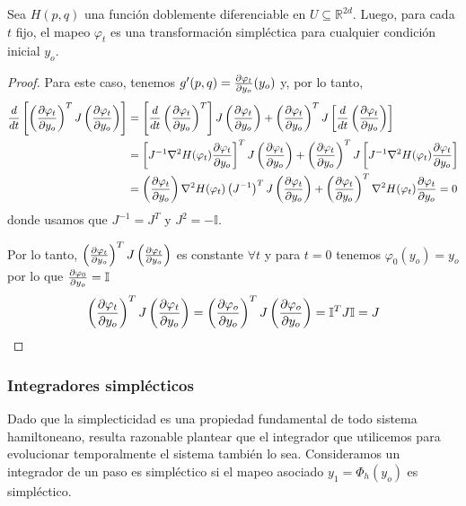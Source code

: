 \begin{theorem}{\label{teo:preservacion_evol}}
  Sea $H(p,q)$ una función doblemente diferenciable en $U\subseteq\mathbb{R}^{2d}$. Luego, para cada $t$ fijo, el mapeo $\varphi_t$ es una transformación simpléctica
  para cualquier condición inicial $y_o$.
\end{theorem}
\begin{proof}
 Para este caso, tenemos $g'(p,q) = \frac{\partial\varphi_t}{\partial y_o}(y_o)$ y, por lo tanto,
 \begin{align*}
  \frac{d}{dt}\left[ \left(\frac{\partial\varphi_t}{\partial y_o}\right)^T J \left(\frac{\partial\varphi_t}{\partial y_o}\right) \right]
  &= \left[\frac{d}{dt}\left(\frac{\partial\varphi_t}{\partial y_o}\right)^T\right] J \left(\frac{\partial\varphi_t}{\partial y_o}\right) + \left(\frac{\partial\varphi_t}{\partial y_o}\right)^T J \left[\frac{d}{dt}\left(\frac{\partial\varphi_t}{\partial y_o}\right)\right] \\
  &= \left[J^{-1} \nabla^2 H(\varphi_t)\frac{\partial\varphi_t}{\partial y_o}\right]^T J \left(\frac{\partial\varphi_t}{\partial y_o}\right) + \left(\frac{\partial\varphi_t}{\partial y_o}\right)^T J \left[J^{-1} \nabla^2 H(\varphi_t)\frac{\partial\varphi_t}{\partial y_o}\right] \\
  &= \left(\frac{\partial\varphi_t}{\partial y_o}\right)\nabla^2 H(\varphi_t)\left(J^{-1} \right)^T J \left(\frac{\partial\varphi_t}{\partial y_o}\right) + \left(\frac{\partial\varphi_t}{\partial y_o}\right)^T \nabla^2 H(\varphi_t)\frac{\partial\varphi_t}{\partial y_o} = 0
 \end{align*}
 donde usamos que $J^{-1} = J^T$ y $J^2 = -\mathbb{I}$.

 Por lo tanto, $\left(\frac{\partial\varphi_t}{\partial y_o}\right)^T J \left(\frac{\partial\varphi_t}{\partial y_o}\right)$ es constante $\forall t$ y para $t=0$ tenemos $\varphi_0(y_o) = y_o$ por lo que $\frac{\partial\varphi_0}{\partial y_o}=\mathbb{I}$
 \[ \left(\frac{\partial\varphi_t}{\partial y_o}\right)^T J \left(\frac{\partial\varphi_t}{\partial y_o}\right) = \left(\frac{\partial\varphi_o}{\partial y_o}\right)^T J \left(\frac{\partial\varphi_o}{\partial y_o}\right) = \mathbb{I}^T J \mathbb{I} = J\]
\end{proof}


\subsubsection{Integradores simplécticos}{\label{sec:int_simpl}}

Dado que la simplecticidad es una propiedad fundamental de todo sistema hamiltoneano, resulta razonable plantear que el integrador que utilicemos para evolucionar temporalmente
el sistema también lo sea.
Consideramos un integrador de un paso es simpléctico si el mapeo asociado $y_1=\Phi_h(y_o)$ es simpléctico.

